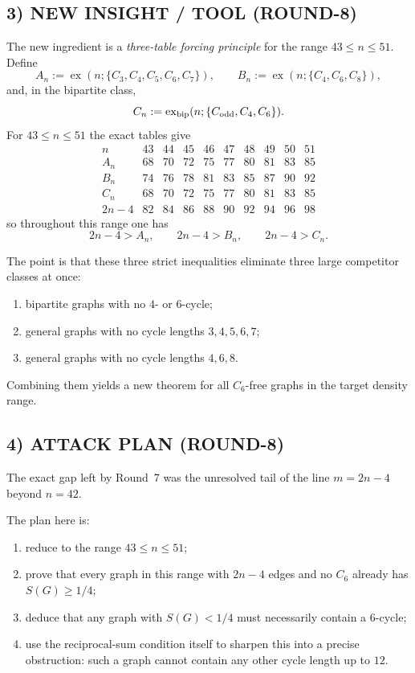 \subsection*{3) NEW INSIGHT / TOOL (ROUND-8)}

The new ingredient is a \emph{three-table forcing principle} for the range $43\le n\le 51$.
Define
\[
A_n:=\operatorname{ex}(n;\{C_3,C_4,C_5,C_6,C_7\}),
\qquad
B_n:=\operatorname{ex}(n;\{C_4,C_6,C_8\}),
\]
and, in the bipartite class,
\[
C_n:=\operatorname{ex}_{\rm bip}(n;\{C_{\mathrm{odd}},C_4,C_6\}).
\]
For $43\le n\le 51$ the exact tables give
\[
\begin{array}{c|ccccccccc}
 n & 43&44&45&46&47&48&49&50&51\\\hline
 A_n & 68&70&72&75&77&80&81&83&85\\
 B_n & 74&76&78&81&83&85&87&90&92\\
 C_n & 68&70&72&75&77&80&81&83&85\\
 2n-4 & 82&84&86&88&90&92&94&96&98
\end{array}
\]
so throughout this range one has
\[
2n-4>A_n,\qquad 2n-4>B_n,\qquad 2n-4>C_n.
\]

The point is that these three strict inequalities eliminate three large competitor classes at once:
\begin{enumerate}
\item bipartite graphs with no $4$- or $6$-cycle;
\item general graphs with no cycle lengths $3,4,5,6,7$;
\item general graphs with no cycle lengths $4,6,8$.
\end{enumerate}
Combining them yields a new theorem for all $C_6$-free graphs in the target density range.

\subsection*{4) ATTACK PLAN (ROUND-8)}

The exact gap left by Round~7 was the unresolved tail of the line $m=2n-4$ beyond $n=42$.

The plan here is:
\begin{enumerate}
\item reduce to the range $43\le n\le 51$;
\item prove that every graph in this range with $2n-4$ edges and no $C_6$ already has $S(G)\ge 1/4$;
\item deduce that any graph with $S(G)<1/4$ must necessarily contain a $6$-cycle;
\item use the reciprocal-sum condition itself to sharpen this into a precise obstruction: such a graph cannot contain any other cycle length up to $12$.
\end{enumerate}


